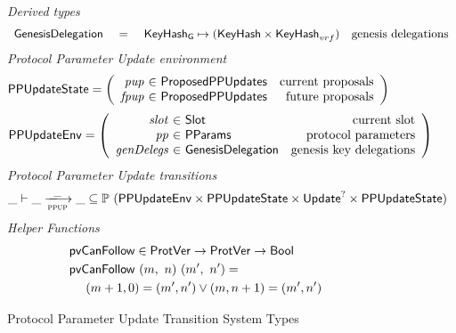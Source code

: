 \begin{figure}[htb]
  \emph{Derived types}
  \begin{equation*}
    \begin{array}{lclr}
      \mathsf{GenesisDelegation}
      & ~=~
      & \mathsf{KeyHash_G}\mapsto(\mathsf{KeyHash}\times\mathsf{KeyHash}_{vrf})
      & \text{genesis delegations} \\
    \end{array}
  \end{equation*}
  \emph{Protocol Parameter Update environment}
  \begin{equation*}
    \PPUpdateState =
    \left(
      \begin{array}{r@{~\in~}lr}
        \var{pup} & \ProposedPPUpdates & \text{current proposals}\\
        \var{fpup} & \ProposedPPUpdates & \text{future proposals}\\
      \end{array}
    \right)
  \end{equation*}
  \begin{equation*}
    \PPUpdateEnv =
    \left(
      \begin{array}{r@{~\in~}lr}
        \var{slot} & \Slot & \text{current slot}\\
        \var{pp} & \PParams & \text{protocol parameters}\\
        \var{genDelegs} & \GenesisDelegation
                        & \text{genesis key delegations} \\
      \end{array}
    \right)
  \end{equation*}
  \emph{Protocol Parameter Update transitions}
  \begin{equation*}
    \_ \vdash
    \var{\_} \trans{ppup}{\_} \var{\_}
    \subseteq \powerset (
    \PPUpdateEnv \times \PPUpdateState \times \Update^? \times \PPUpdateState)
  \end{equation*}
  \emph{Helper Functions}
  \begin{align*}
      & \mathsf{pvCanFollow} \in \mathsf{ProtVer} \to \mathsf{ProtVer} \to \mathsf{Bool}\\
      & \mathsf{pvCanFollow}~(m,~n)~(m',~n') = \\
      & ~~~~(m + 1, 0) = (m', n') \lor (m, n + 1) = (m', n')
  \end{align*}
  \caption{Protocol Parameter Update Transition System Types}
  \label{fig:ts-types:pp-update}
\end{figure}

